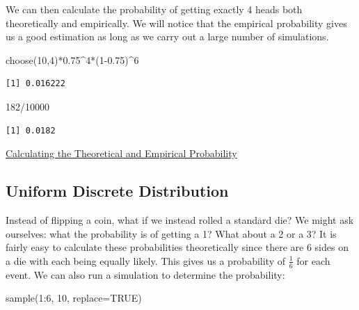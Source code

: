 \documentclass[
  letterpaper,
  DIV=11,
  numbers=noendperiod]{scrreprt}
\newenvironment{Shaded}{\begin{snugshade}}{\end{snugshade}}
\newcommand{\AttributeTok}[1]{\textcolor[rgb]{0.40,0.45,0.13}{#1}}
\newcommand{\ConstantTok}[1]{\textcolor[rgb]{0.56,0.35,0.01}{#1}}
\newcommand{\DecValTok}[1]{\textcolor[rgb]{0.68,0.00,0.00}{#1}}
\newcommand{\FloatTok}[1]{\textcolor[rgb]{0.68,0.00,0.00}{#1}}
\newcommand{\FunctionTok}[1]{\textcolor[rgb]{0.28,0.35,0.67}{#1}}
\newcommand{\NormalTok}[1]{\textcolor[rgb]{0.00,0.23,0.31}{#1}}
\newcommand{\SpecialCharTok}[1]{\textcolor[rgb]{0.37,0.37,0.37}{#1}}
\begin{document}
We can then calculate the probability of getting exactly 4 heads both
theoretically and empirically. We will notice that the empirical
probability gives us a good estimation as long as we carry out a large
number of simulations.

\begin{Shaded}
\begin{Highlighting}[]
\FunctionTok{choose}\NormalTok{(}\DecValTok{10}\NormalTok{,}\DecValTok{4}\NormalTok{)}\SpecialCharTok{*}\FloatTok{0.75}\SpecialCharTok{\^{}}\DecValTok{4}\SpecialCharTok{*}\NormalTok{(}\DecValTok{1}\FloatTok{{-}0.75}\NormalTok{)}\SpecialCharTok{\^{}}\DecValTok{6}
\end{Highlighting}
\end{Shaded}

\begin{verbatim}
[1] 0.016222
\end{verbatim}

\begin{Shaded}
\begin{Highlighting}[]
\DecValTok{182}\SpecialCharTok{/}\DecValTok{10000}
\end{Highlighting}
\end{Shaded}

\begin{verbatim}
[1] 0.0182
\end{verbatim}

\begin{watch}{}{}
    \href{https://youtu.be/SDBW7QNa6HA}{Calculating the Theoretical and Empirical Probability}
\end{watch}

\subsection{Uniform Discrete
Distribution}\label{uniform-discrete-distribution}

Instead of flipping a coin, what if we instead rolled a standard die? We
might ask ourselves: what the probability is of getting a 1? What about
a 2 or a 3? It is fairly easy to calculate these probabilities
theoretically since there are 6 sides on a die with each being equally
likely. This gives us a probability of \(\frac{1}{6}\) for each event.
We can also run a simulation to determine the probability:

\begin{Shaded}
\begin{Highlighting}[]
\FunctionTok{sample}\NormalTok{(}\DecValTok{1}\SpecialCharTok{:}\DecValTok{6}\NormalTok{, }\DecValTok{10}\NormalTok{, }\AttributeTok{replace=}\ConstantTok{TRUE}\NormalTok{)}
\end{Highlighting}
\end{Shaded}
\end{document}
